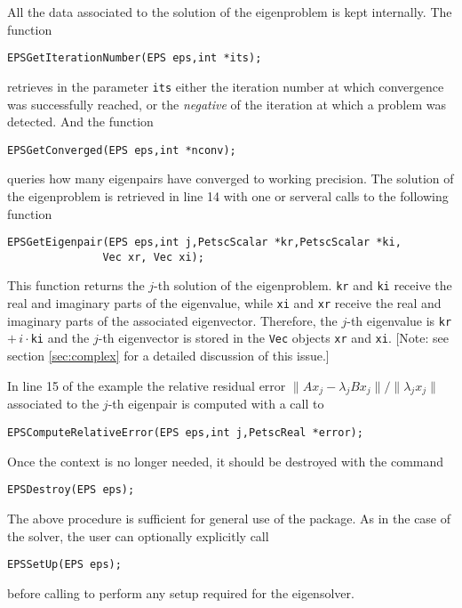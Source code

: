         All the data associated to the solution of the eigenproblem is kept internally. The function
	\begin{Verbatim}[fontsize=\small]
        EPSGetIterationNumber(EPS eps,int *its);
	\end{Verbatim}
        retrieves in the parameter \texttt{its} either the iteration number at which convergence was successfully reached, or the \emph{negative} of the iteration at which a problem was detected. And the function
	\begin{Verbatim}[fontsize=\small]
	EPSGetConverged(EPS eps,int *nconv);
	\end{Verbatim}
	queries how many eigenpairs have converged to working precision. The solution of the eigenproblem is retrieved in line 14 with one or serveral calls to the following function
	\begin{Verbatim}[fontsize=\small]
	EPSGetEigenpair(EPS eps,int j,PetscScalar *kr,PetscScalar *ki,
               Vec xr, Vec xi);
	\end{Verbatim}
	\label{GetEigenpair}
	This function returns the $j$-th solution of the eigenproblem. \texttt{kr} and \texttt{ki} receive the real and imaginary parts of the eigenvalue, while \texttt{xi} and \texttt{xr} receive the real and imaginary parts of the associated eigenvector. Therefore, the $j$-th eigenvalue is \texttt{kr}$+\,i\cdot$\texttt{ki} and the $j$-th eigenvector is stored in the \texttt{Vec} objects \texttt{xr} and \texttt{xi}. 
	[Note: see section \ref{sec:complex} for a detailed discussion of this issue.] 
	
	In line 15 of the example the relative residual error $\|Ax_j\!-\!\lambda_jBx_j\|/\|\lambda_jx_j\|$ associated to the $j$-th eigenpair is computed with a call to
	\begin{Verbatim}[fontsize=\small]
	EPSComputeRelativeError(EPS eps,int j,PetscReal *error);
	\end{Verbatim}

	Once the  context is no longer needed, it should be destroyed with the command
	\begin{Verbatim}[fontsize=\small]
	EPSDestroy(EPS eps);
	\end{Verbatim}

	The above procedure is sufficient for general use of the  package. As in the case of the  solver, the user can optionally explicitly call 
	\begin{Verbatim}[fontsize=\small]
	EPSSetUp(EPS eps);
	\end{Verbatim}
before calling  to perform any setup required for the eigensolver.


